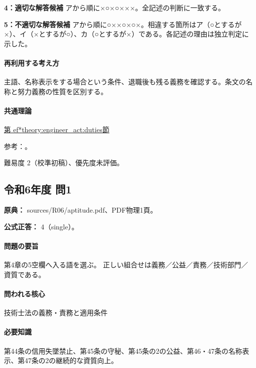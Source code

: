 \noindent\textbf{4：適切な解答候補} アから順に×○×○×××。全記述の判断に一致する。\par

\noindent\textbf{5：不適切な解答候補} アから順に○××○×○×。相違する箇所はア（○とするが×）、イ（×とするが○）、カ（○とするが×）である。各記述の理由は独立判定に示した。\par

\paragraph{再利用する考え方} 主語、名称表示をする場合という条件、退職後も残る義務を確認する。条文の名称と努力義務の性質を区別する。

\paragraph{共通理論} \hyperref[theory:engineer_act:duties]{第
ef*{theory:engineer_act:duties}節}

\par 参考：\cite{engineer_act_current}。

\par 難易度 2（校準初稿）、優先度未評価。

\subsection{令和6年度 問1}
\label{q:r06-reg-apt-01}

\noindent\textbf{原典：} sources/R06/aptitude.pdf、PDF物理1頁。

\textbf{公式正答：} 4（single）。

\paragraph{問題の要旨} 第4章の5空欄へ入る語を選ぶ。 正しい組合せは義務／公益／責務／技術部門／資質である。

\paragraph{問われる核心} 技術士法の義務・責務と適用条件

\paragraph{必要知識} 第44条の信用失墜禁止、第45条の守秘、第45条の2の公益、第46・47条の名称表示、第47条の2の継続的な資質向上。

